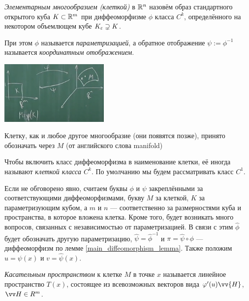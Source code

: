 \begin{definition}
	\textit{Элементарным многообразием (клеткой)} в $\mathbb{R}^n$ назовём образ стандартного открытого куба $K \subset \mathbb{R}^m$ при диффеоморфизме $\phi$ класса $C^k$, определённого на некотором объемлющем кубе $K_\varepsilon \supsetneq K$.
	
	При этом $\phi$ называется \textit{параметризацией}, а обратное отображение $\psi := \phi^{-1}$ называется \textit{координатным отображением}.
\end{definition}

\begin{center}
	\includegraphics[width=0.4\textwidth]{images/cell.png}
\end{center}

\begin{note}
	Клетку, как и любое другое многообразие (они появятся позже), принято обозначать через $M$ (от английского слова manifold)
\end{note}

\begin{note}
	Чтобы включить класс диффеоморфизма в наименование клетки, её иногда называют \textit{клеткой класса $C^k$}. По умолчанию мы будем рассматривать класс $C^1$.
\end{note}

\begin{designation}
	Если не обговорено явно, считаем буквы $\phi$ и $\psi$ закреплёнными за соответствующими диффеоморфизмами, букву $M$ за клеткой, $K$ за параметризующим кубом, а $m$ и $n$ --- соответственно за размерностями куба и пространства, в которое вложена клетка. Кроме того, будет возникать много вопросов, связанных с независимостью от параметризацией. В связи с этим $\hat\phi$ будет обозначать другую параметризацию, $\hat\psi = \hat\phi^{-1}$ и $\pi = \hat\psi\circ\phi$ --- диффеоморфизм по лемме \ref{main_diffeomorphism_lemma}. Также положим $u = \psi(x)$ и $v = \hat\psi(x)$.
\end{designation}

\begin{definition}
	\textit{Касательным пространством} к клетке $M$ в точке $x$ называется линейное пространство $T(x)$, состоящее из всевозможных векторов вида $\phi'(u)\vv{H}$, $\vv H \in R^m$.
\end{definition}

